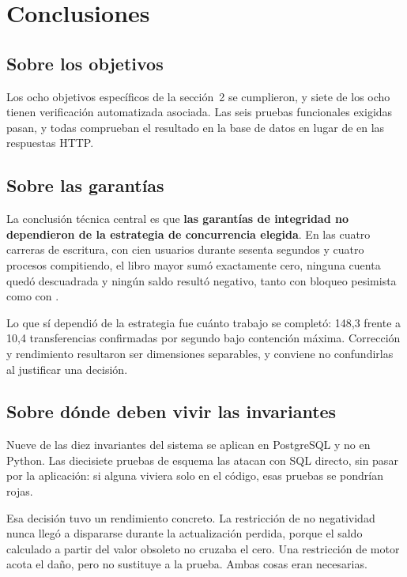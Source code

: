 \section{Conclusiones}
\label{sec:conclusiones}

\subsection{Sobre los objetivos}

Los ocho objetivos específicos de la sección~2 se cumplieron, y siete de los
ocho tienen verificación automatizada asociada. Las seis pruebas funcionales
exigidas pasan, y todas comprueban el resultado en la base de datos en lugar
de en las respuestas HTTP.

\subsection{Sobre las garantías}

La conclusión técnica central es que \textbf{las garantías de integridad no
dependieron de la estrategia de concurrencia elegida}. En las cuatro carreras
de escritura, con cien usuarios durante sesenta segundos y cuatro procesos
compitiendo, el libro mayor sumó exactamente cero, ninguna cuenta quedó
descuadrada y ningún saldo resultó negativo, tanto con bloqueo pesimista como
con .

Lo que sí dependió de la estrategia fue cuánto trabajo se completó: 148,3
frente a 10,4 transferencias confirmadas por segundo bajo contención máxima.
Corrección y rendimiento resultaron ser dimensiones separables, y conviene no
confundirlas al justificar una decisión.

\subsection{Sobre dónde deben vivir las invariantes}

Nueve de las diez invariantes del sistema se aplican en PostgreSQL y no en
Python. Las diecisiete pruebas de esquema las atacan con SQL directo, sin
pasar por la aplicación: si alguna viviera solo en el código, esas pruebas se
pondrían rojas.

Esa decisión tuvo un rendimiento concreto. La restricción de no negatividad
nunca llegó a dispararse durante la actualización perdida, porque el saldo
calculado a partir del valor obsoleto no cruzaba el cero. Una restricción de
motor acota el daño, pero no sustituye a la prueba. Ambas cosas eran
necesarias.

